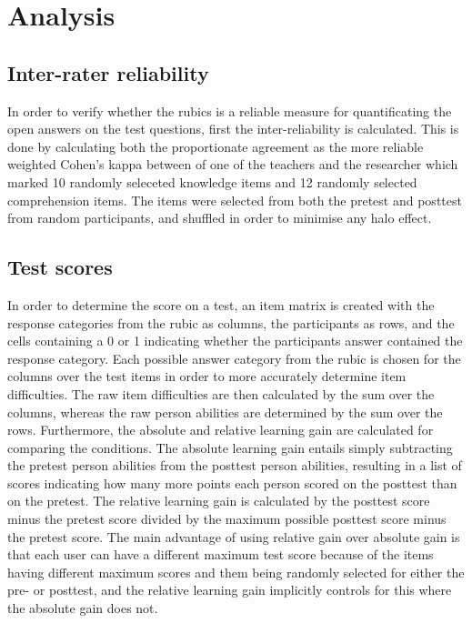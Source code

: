 \section{Analysis}
\label{sec:analysis}

\subsection{Inter-rater reliability}

In order to verify whether the rubics is a reliable measure for quantificating the open answers on the test questions, first the inter-reliability is calculated. This is done by calculating both the proportionate agreement as the more reliable weighted Cohen's kappa \cite{kappa} between of one of the teachers and the researcher which marked 10 randomly seleceted knowledge items and 12 randomly selected comprehension items. The items were selected from both the pretest and posttest from random participants, and shuffled in order to minimise any halo effect.

\subsection{Test scores}

In order to determine the score on a test, an item matrix is created with the response categories from the rubic as columns, the participants as rows, and the cells containing a 0 or 1 indicating whether the participants answer contained the response category. Each possible answer category from the rubic is chosen for the columns over the test items in order to more accurately determine item difficulties. The raw item difficulties are then calculated by the sum over the columns, whereas the raw person abilities are determined by the sum over the rows. Furthermore, the absolute and relative learning gain are calculated for comparing the conditions. The absolute learning gain entails simply subtracting the pretest person abilities from the posttest person abilities, resulting in a list of scores indicating how many more points each person scored on the posttest than on the pretest. The relative learning gain is calculated by the posttest score minus the pretest score divided by the maximum possible posttest score minus the pretest score. The main advantage of using relative gain over absolute gain is that each user can have a different maximum test score because of the items having different maximum scores and them being randomly selected for either the pre- or posttest, and the relative learning gain implicitly controls for this where the absolute gain does not.

